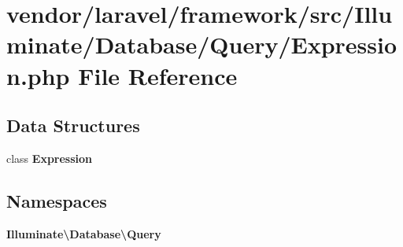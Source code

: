 \section{vendor/laravel/framework/src/\+Illuminate/\+Database/\+Query/\+Expression.php File Reference}
\label{laravel_2framework_2src_2_illuminate_2_database_2_query_2_expression_8php}
\subsection*{Data Structures}
\begin{DoxyCompactItemize}
\item 
class {\bf Expression}
\end{DoxyCompactItemize}
\subsection*{Namespaces}
\begin{DoxyCompactItemize}
\item 
 {\bf Illuminate\textbackslash{}\+Database\textbackslash{}\+Query}
\end{DoxyCompactItemize}
